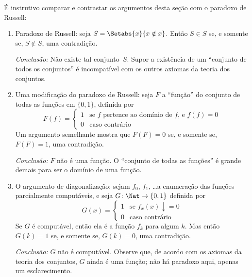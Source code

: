 \documentclass[../../../include/open-logic-section]{subfiles}
\begin{document}

É instrutivo comparar e contrastar os argumentos desta seção com o
paradoxo de Russell:
\begin{enumerate}
\item Paradoxo de Russell: seja $S = \Setabs{x}{x \notin x}$. Então
  $S \in S$ se, e somente se, $S \notin S$, uma contradição.

  \emph{Conclusão:} Não existe tal conjunto~$S$. Supor a existência de
  um ``conjunto de todos os conjuntos'' é incompatível com os outros
  axiomas da teoria dos conjuntos.

\item Uma modificação do paradoxo de Russell: seja $F$ a ``função''
  do conjunto de todas as funções em $\{ 0, 1 \}$, definida por
  \[
  F(f) =
  \begin{cases}
    1 & \text{se $f$ pertence ao domínio de $f$, e $f(f) = 0$} \\
    0 & \text{caso contrário}
  \end{cases}
  \]
  Um argumento semelhante mostra que $F(F) = 0$ se, e somente se,
  $F(F) = 1$, uma contradição.

  \emph{Conclusão:} $F$ não é uma função. O ``conjunto de todas as
  funções'' é grande demais para ser o domínio de uma função.

\item O argumento de diagonalização: sejam $f_0$, $f_1$, \dots a
  enumeração das funções parcialmente computáveis, e seja
  $G \colon \Nat \to \{ 0, 1 \}$ definida por
  \[
  G(x) =
  \begin{cases}
    1 & \text{se $f_x(x)\downarrow = 0$} \\
    0 & \text{caso contrário}
  \end{cases}
  \]
  Se $G$ é computável, então ela é a função $f_k$ para algum
  $k$. Mas então $G(k) = 1$ se, e somente se, $G(k) = 0$, uma
  contradição.

  \emph{Conclusão:} $G$ não é computável. Observe que, de acordo com os
  axiomas da teoria dos conjuntos, $G$ ainda é uma função; não há
  paradoxo aqui, apenas um esclarecimento.
\end{enumerate}
\end{document}
